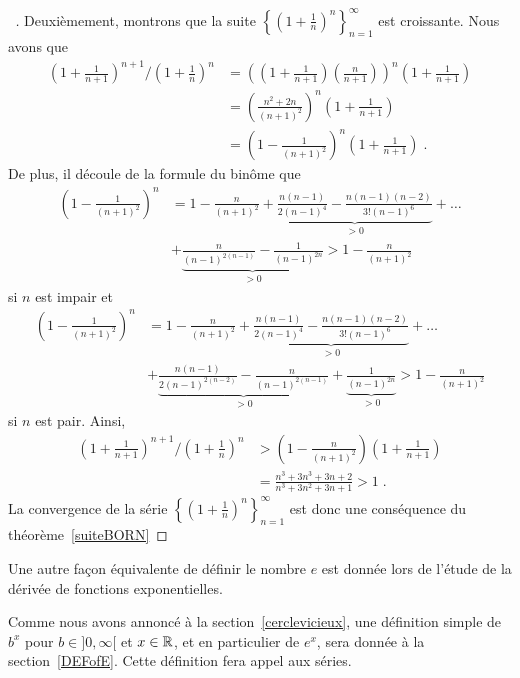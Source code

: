 {\begin{proof}[\UOproof\ \theory]
Deuxièmement, montrons que la suite
$\displaystyle \left\{\left(1+\frac{1}{n}\right)^n\right\}_{n=1}^\infty$
est croissante.  Nous avons que
\begin{align*}
\left(1+\frac{1}{n+1}\right)^{n+1}\bigg/
\left(1+\frac{1}{n}\right)^n
&= \left( \left(1+\frac{1}{n+1}\right)\left(\frac{n}{n+1}\right) \right)^n
\left(1+\frac{1}{n+1}\right) \\
&= \left( \frac{n^2+2n}{(n+1)^2} \right)^n
\left(1+\frac{1}{n+1}\right) \\
&= \left(1- \frac{1}{(n+1)^2} \right)^n \left(1+\frac{1}{n+1}\right) \; .
\end{align*}
De plus, il découle de la formule du binôme que
\begin{align*}
\left(1- \frac{1}{(n+1)^2} \right)^n &=
1 - \frac{n}{(n+1)^2} + \underbrace{\frac{n(n-1)}{2(n-1)^4} -
\frac{n(n-1)(n-2)}{3!(n-1)^6}}_{>0} + \ldots \\
& + \underbrace{\frac{n}{(n-1)^{2(n-1)}} - \frac{1}{(n-1)^{2n}}}_{>0}
> 1 - \frac{n}{(n+1)^2}
\end{align*}
si $n$ est impair et
\begin{align*}
\left(1- \frac{1}{(n+1)^2} \right)^n &=
1 - \frac{n}{(n+1)^2} + \underbrace{\frac{n(n-1)}{2(n-1)^4} -
\frac{n(n-1)(n-2)}{3!(n-1)^6}}_{>0} + \ldots \\
&+ \underbrace{\frac{n(n-1)}{2(n-1)^{2(n-2)}} -
\frac{n}{(n-1)^{2(n-1)}}}_{>0} + \underbrace{\frac{1}{(n-1)^{2n}}}_{>0}
> 1 - \frac{n}{(n+1)^2}
\end{align*}
si $n$ est pair.  Ainsi,
\begin{align*}
\left(1+\frac{1}{n+1}\right)^{n+1}\bigg/
\left(1+\frac{1}{n}\right)^n
&> \left(1 - \frac{n}{(n+1)^2}\right)\left(1+\frac{1}{n+1}\right) \\
&= \frac{n^3+3n^3+3n+2}{n^3+3n^2+3n+1}>1 \; .
\end{align*}
La convergence de la série
$\displaystyle \left\{\left(1+\frac{1}{n}\right)^n\right\}_{n=1}^\infty$
est donc une conséquence du théorème~\ref{suiteBORN}
\end{proof}

\begin{rmk}
Une autre façon équivalente de définir le nombre $e$ est donnée
lors de l'étude de la dérivée de fonctions exponentielles.
\end{rmk}

\begin{rmk}[\theory]
Comme nous avons annoncé à la section~\ref{cerclevicieux},
une définition simple de $b^x$ pour $b\in]0,\infty[$ et $x\in \mathbb{R}$, et
en particulier de $e^x$, sera donnée à la section~\ref{DEFofE}. 
Cette définition fera appel aux séries.
\end{rmk}

}
